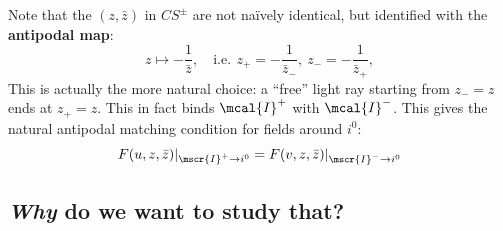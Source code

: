 \documentclass[a4paper
	,10pt
]{article}
\begin{document}
\pagebreak[4]
	Note that the $(z,\bar{z})$ in $CS^\pm$ are not na\"ively identical, but identified with the \textbf{antipodal map}:
	\begin{equation}
		z \mapsto -\frac{1}{\bar{z}},
	\quad
		\text{i.e.}\,\ %
		z_+ = - \frac{1}{\bar{z}_-},
	\ %
		z_- = - \frac{1}{\bar{z}_+},
	\end{equation}
	This is actually the more natural choice: a ``free'' light ray starting from $z_- = z$ ends at $z_+ = z$. This in fact binds $\mcal{I}^+$ with $\mcal{I}^-$. 
	This gives the natural antipodal matching condition for fields around $i^0$:
	\begin{equation}
		F(u,z,\bar{z})|_{\mscr{I}^+\to i^0}
		= F(v,z,\bar{z})|_{\mscr{I}^-\to i^0}
	\end{equation}
\subsection{\textsl{Why} do we want to study that?}
\end{document}
